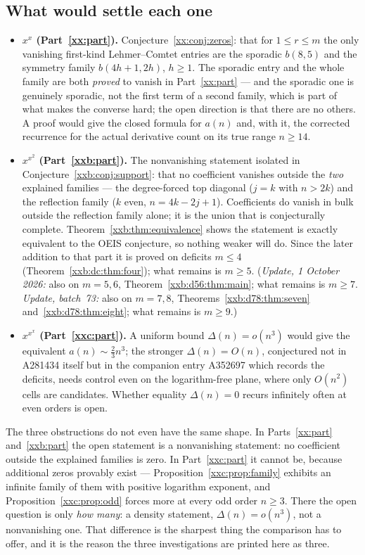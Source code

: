 \documentclass[11pt,a4paper]{article}
\numberwithin{equation}{section}
\theoremstyle{definition}
\theoremstyle{remark}
\theoremstyle{plain}
\begin{document}
\subsection{What would settle each one}\label{syn:open}

\begin{itemize}[leftmargin=1.6em,itemsep=3pt]
\item \textbf{$x^x$ (Part~\ref{xx:part}).}  Conjecture~\ref{xx:conj:zeros}: that
 for $1\le r\le m$ the only vanishing first-kind Lehmer--Comtet entries are
 the sporadic $b(8,5)$ and the symmetry family $b(4h+1,2h)$, $h\ge1$.  The
 sporadic entry and the whole family are both \emph{proved} to vanish in
 Part~\ref{xx:part} --- and the sporadic one is genuinely sporadic, not the
 first term of a second family, which is part of what makes the converse hard;
 the open direction is that there are no others.  A proof would give the closed formula for $a(n)$ and,
 with it, the corrected recurrence for the actual derivative count on its true
 range $n\ge14$.
\item \textbf{$x^{x^2}$ (Part~\ref{xxb:part}).}  The nonvanishing statement
 isolated in Conjecture~\ref{xxb:conj:support}: that no coefficient vanishes
 outside the \emph{two} explained families --- the degree-forced top diagonal
 ($j=k$ with $n>2k$) and the reflection family ($k$ even, $n=4k-2j+1$).
 Coefficients do vanish in bulk outside the reflection family alone; it is the
 union that is conjecturally complete.  Theorem~\ref{xxb:thm:equivalence} shows
 the statement is exactly equivalent to the OEIS conjecture, so nothing weaker
 will do.  Since the later addition to that part it is proved on deficits
 $m\le4$ (Theorem~\ref{xxb:dc:thm:four}); what remains is $m\ge5$.
 (\emph{Update, 1 October 2026:} also on $m=5,6$,
 Theorem~\ref{xxb:d56:thm:main}; what remains is $m\ge7$.  \emph{Update,
 batch~73:} also on $m=7,8$, Theorems~\ref{xxb:d78:thm:seven}
 and~\ref{xxb:d78:thm:eight}; what remains is $m\ge9$.)
\item \textbf{$x^{x^x}$ (Part~\ref{xxc:part}).}  A uniform bound
 $\Delta(n)=o(n^3)$ would give the equivalent $a(n)\sim\tfrac23n^3$; the
 stronger $\Delta(n)=O(n)$, conjectured not in A281434 itself but in the
 companion entry A352697 which records the deficits, needs control even on the
 logarithm-free plane, where only $O(n^2)$ cells are candidates.  Whether
 equality $\Delta(n)=0$ recurs infinitely often at even orders is open.
\end{itemize}

The three obstructions do not even have the same shape.  In
Parts~\ref{xx:part} and~\ref{xxb:part} the open statement is a nonvanishing
statement: no coefficient outside the explained families is zero.  In
Part~\ref{xxc:part} it cannot be, because additional zeros provably exist ---
Proposition~\ref{xxc:prop:family} exhibits an infinite family of them with
positive logarithm exponent, and Proposition~\ref{xxc:prop:odd} forces more at
every odd order $n\ge3$.  There the open question is only \emph{how many}: a
density statement, $\Delta(n)=o(n^3)$, not a nonvanishing one.  That difference
is the sharpest thing the comparison has to offer, and it is the reason the
three investigations are printed here as three.
\end{document}
